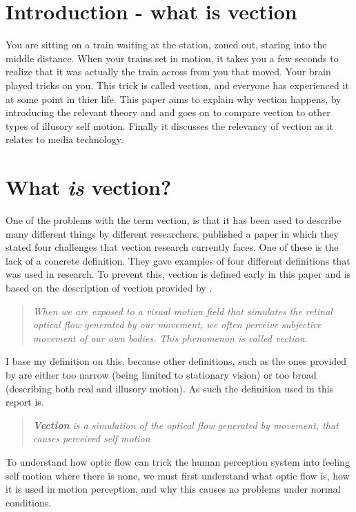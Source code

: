 \documentclass[11pt,a4paper,oneside,table,xcdraw]{article}
\begin{document}



\section{Introduction - what is vection}
You are sitting on a train waiting at the station, zoned out, staring into the middle distance. When your trains set in motion, it takes you a few seconds to realize that it was actually the train across from you that moved. Your brain played tricks on you. This trick is called vection, and everyone has experienced it at some point in thier life. This paper aims to explain why vection happens, by introducing the relevant theory and and goes on to compare vection to other types of illusory self motion. Finally it discusses the relevancy of vection as it relates to media technology. 
\section{What \textit{is} vection?}
\label{sec:def}
One of the problems with the term vection, is that it has been used to describe many different things by different researchers. \cite{challenges} published a paper in which they stated four challenges that vection research currently faces. One of these is the lack of a concrete definition. They gave examples of four different definitions that was used in research. To prevent this, vection is defined early in this paper and is based on the description of vection provided by \cite{vection}.
\begin{quote}
\textit{When we are exposed to a visual motion field that simulates the retinal optical flow generated by our movement, we often perceive subjective movement of our own bodies. This phenomenon is called vection.}
\end{quote}
I base my definition on this, because other definitions, such as the ones provided by \cite{challenges} are either too narrow (being limited to stationary vision) or too broad (describing both real and illusory motion). As such the definition used in this report is.
\begin{quote}
\textit{\textbf{Vection} is a simulation of the optical flow generated by movement, that causes perceived self motion}
\end{quote}
To understand how optic flow can trick the human perception system into feeling self motion where there is none, we must first understand what optic flow is, how it is used in motion perception, and why this causes no problems under normal conditions.
\end{document}
